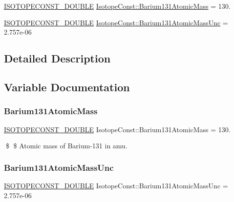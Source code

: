 \begin{DoxyCompactItemize}
\item 
\mbox{\hyperlink{group___isotope_const-_macros_ga8f45a7272ce02c0b4c65c44636ed719a}{I\+S\+O\+T\+O\+P\+E\+C\+O\+N\+S\+T\+\_\+\+D\+O\+U\+B\+LE}} \mbox{\hyperlink{group___isotope_const-_barium-_ba131_ga2f6e6ed403124a16299fe13579f0dc00}{Isotope\+Const\+::\+Barium131\+Atomic\+Mass}} = 130.
\item 
\mbox{\hyperlink{group___isotope_const-_macros_ga8f45a7272ce02c0b4c65c44636ed719a}{I\+S\+O\+T\+O\+P\+E\+C\+O\+N\+S\+T\+\_\+\+D\+O\+U\+B\+LE}} \mbox{\hyperlink{group___isotope_const-_barium-_ba131_ga98b0e139a0f2d5d27ec6dbf3156fefd9}{Isotope\+Const\+::\+Barium131\+Atomic\+Mass\+Unc}} = 2.\+757e-\/06
\end{DoxyCompactItemize}


\subsection{Detailed Description}


\subsection{Variable Documentation}
\mbox{\label{group___isotope_const-_barium-_ba131_ga2f6e6ed403124a16299fe13579f0dc00}} 
\subsubsection{\texorpdfstring{Barium131\+Atomic\+Mass}{Barium131AtomicMass}}
{\footnotesize\ttfamily \mbox{\hyperlink{group___isotope_const-_macros_ga8f45a7272ce02c0b4c65c44636ed719a}{I\+S\+O\+T\+O\+P\+E\+C\+O\+N\+S\+T\+\_\+\+D\+O\+U\+B\+LE}} Isotope\+Const\+::\+Barium131\+Atomic\+Mass = 130.}

\$ \$ Atomic mass of Barium-\/131 in amu. \mbox{\label{group___isotope_const-_barium-_ba131_ga98b0e139a0f2d5d27ec6dbf3156fefd9}} 
\subsubsection{\texorpdfstring{Barium131\+Atomic\+Mass\+Unc}{Barium131AtomicMassUnc}}
{\footnotesize\ttfamily \mbox{\hyperlink{group___isotope_const-_macros_ga8f45a7272ce02c0b4c65c44636ed719a}{I\+S\+O\+T\+O\+P\+E\+C\+O\+N\+S\+T\+\_\+\+D\+O\+U\+B\+LE}} Isotope\+Const\+::\+Barium131\+Atomic\+Mass\+Unc = 2.\+757e-\/06}

